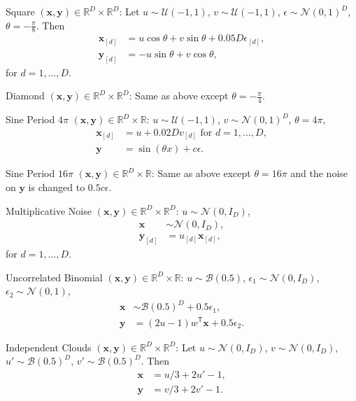 \documentclass[11pt]{article}
\providecommand{\mb}[1]{\boldsymbol{#1}}
\providecommand{\mc}[1]{\mathcal{#1}}
\newcommand{\Real}{\mathbb{R}}
\newcommand{\T}{^{\ensuremath{\mathsf{T}}}}           %
\begin{document}
\begin{compactenum}
\item Square $(\mb{x},\mb{y}) \in \Real^{D} \times \Real^{D}$: Let $u \sim \mc{U}(-1,1)$, $v \sim \mc{U}(-1,1)$, $\epsilon \sim \mc{N}(0,1)^{D}$, $\theta=-\frac{\pi}{8}$. Then
\begin{align*}
\mb{x}_{[d]}&=u \cos\theta + v \sin\theta + 0.05 D\epsilon_{[d]},\\
\mb{y}_{[d]}&=-u \sin\theta + v \cos\theta,
\end{align*}
for $d=1,\ldots,D$.
\item Diamond $(\mb{x},\mb{y}) \in \Real^{D} \times \Real^{D}$: Same as above except $\theta=-\frac{\pi}{4}$.
\item Sine Period $4\pi$ $(\mb{x},\mb{y}) \in \Real^{D} \times \Real$: $u \sim \mc{U}(-1,1)$, $v \sim \mc{N}(0,1)^{D}$, $\theta=4\pi$,
\begin{align*}
\mb{x}_{[d]}&=u+0.02 D v_{[d]} \mbox{ for $d=1,\ldots,D$}, \\
\mb{y}&=\sin ( \theta x )+c\epsilon.
\end{align*}
\item Sine Period $16\pi$ $(\mb{x},\mb{y}) \in \Real^{D} \times \Real$: Same as above except $\theta=16\pi$ and the noise on $\mb{y}$ is changed to $0.5c\epsilon$.
\item Multiplicative Noise $(\mb{x},\mb{y}) \in \Real^{D} \times \Real^{D}$: $u \sim \mc{N}(0, I_{D})$, %
\begin{align*}
\mb{x} &\sim \mc{N}(0, I_{D}),\\
\mb{y}_{[d]}&=u_{[d]}\mb{x}_{[d]},%
\end{align*}
for $d=1,\ldots,D$.
\item Uncorrelated Binomial $(\mb{x},\mb{y}) \in \Real^{D} \times \Real$: $u \sim \mc{B}(0.5)$, $\epsilon_{1} \sim \mc{N}(0, I_{D})$, $\epsilon_{2} \sim \mc{N}(0, 1)$,
\begin{align*}
\mb{x} &\sim \mc{B}(0.5)^{D}+0.5\epsilon_{1},\\
\mb{y}&=(2u-1)w\T \mb{x}+0.5\epsilon_{2}.
\end{align*}
\item Independent Clouds $(\mb{x},\mb{y}) \in \Real^{D} \times \Real^{D}$: Let $u \sim \mc{N}(0,I_{D})$, $v \sim \mc{N}(0,I_{D})$, $u' \sim \mc{B}(0.5)^{D}$, $v' \sim \mc{B}(0.5)^{D}$. Then
\begin{align*}
\mb{x}&=u/3+2u'-1,\\
\mb{y}&=v/3+2v'-1.
\end{align*}
\end{compactenum}
\end{document}
